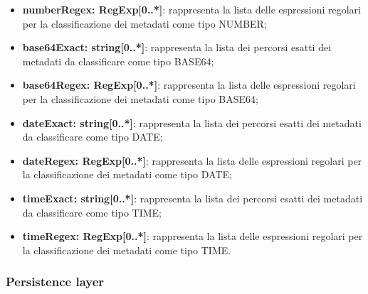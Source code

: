 \documentclass[a4paper,12pt]{article}
\begin{document}
{{{\begin{itemize}
                    \item \textbf{numberRegex: RegExp[0..*]}: rappresenta la lista delle espressioni regolari per la classificazione dei metadati come tipo NUMBER;
                    \item \textbf{base64Exact: string[0..*]}: rappresenta la lista dei percorsi esatti dei metadati da classificare come tipo BASE64;
                    \item \textbf{base64Regex: RegExp[0..*]}: rappresenta la lista delle espressioni regolari per la classificazione dei metadati come tipo BASE64;
                    \item \textbf{dateExact: string[0..*]}: rappresenta la lista dei percorsi esatti dei metadati da classificare come tipo DATE;
                    \item \textbf{dateRegex: RegExp[0..*]}: rappresenta la lista delle espressioni regolari per la classificazione dei metadati come tipo DATE;
                    \item \textbf{timeExact: string[0..*]}: rappresenta la lista dei percorsi esatti dei metadati da classificare come tipo TIME;
                    \item \textbf{timeRegex: RegExp[0..*]}: rappresenta la lista delle espressioni regolari per la classificazione dei metadati come tipo TIME.
                \end{itemize}
            }

            \subsubsection{Persistence layer}\label{sec:Persistence-layer} {
}}}
\end{document}
